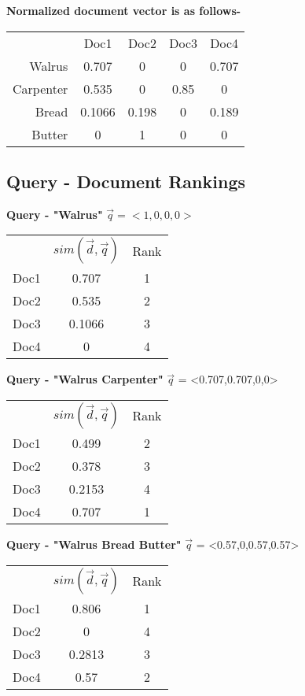\documentclass{article}
\begin{document}
\vspace{5mm}
\textbf{Normalized document vector is as follows-}

\begin{tabular}{ r|c|c|c|c| }
\multicolumn{1}{r}{}
 & \multicolumn{1}{c}{Doc1}
 & \multicolumn{1}{c}{Doc2}
 & \multicolumn{1}{c}{Doc3}
 & \multicolumn{1}{c}{Doc4} \\
\cline{2-5}
Walrus & 0.707 & 0 & 0 & 0.707 \\
\cline{2-5}
Carpenter & 0.535 & 0 & 0.85 & 0 \\
\cline{2-5}
Bread & 0.1066 & 0.198 & 0 & 0.189 \\
\cline{2-5}
Butter & 0 & 1 & 0 & 0 \\
\cline{2-5}
\end{tabular}

\subsection{Query - Document Rankings}

\vspace{5mm}
\textbf{Query - "Walrus"}
$\vec{q} = <1,0,0,0>$
\begin{tabular}{ r|c|c| }
\multicolumn{1}{r}{}
 & \multicolumn{1}{c}{$sim(\vec{d},\vec{q})$}
 & \multicolumn{1}{c}{Rank} \\
\cline{2-3}
Doc1 & 0.707 & 1 \\
\cline{2-3}
Doc2 & 0.535 & 2 \\
\cline{2-3}
Doc3 & 0.1066 & 3 \\
\cline{2-3}
Doc4 & 0 & 4 \\
\cline{2-3}
\end{tabular}

\vspace{5mm}
\textbf{Query - "Walrus Carpenter"}
$\vec{q}$ = <0.707,0.707,0,0>
\begin{tabular}{ r|c|c| }
\multicolumn{1}{r}{}
 & \multicolumn{1}{c}{$sim(\vec{d},\vec{q})$}
 & \multicolumn{1}{c}{Rank} \\
\cline{2-3}
Doc1 & 0.499 & 2 \\
\cline{2-3}
Doc2 & 0.378 & 3 \\
\cline{2-3}
Doc3 & 0.2153 & 4 \\
\cline{2-3}
Doc4 & 0.707 & 1 \\
\cline{2-3}
\end{tabular}

\vspace{5mm}
\textbf{Query - "Walrus Bread Butter"}
$\vec{q}$ = <0.57,0,0.57,0.57>
\begin{tabular}{ r|c|c| }
\multicolumn{1}{r}{}
 & \multicolumn{1}{c}{$sim(\vec{d},\vec{q})$}
 & \multicolumn{1}{c}{Rank} \\
\cline{2-3}
Doc1 & 0.806 & 1 \\
\cline{2-3}
Doc2 & 0 & 4 \\
\cline{2-3}
Doc3 & 0.2813 & 3 \\
\cline{2-3}
Doc4 & 0.57 & 2 \\
\cline{2-3}
\end{tabular}
\end{document}

